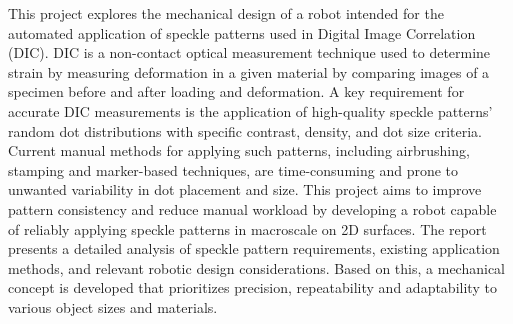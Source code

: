 This project explores the mechanical design of a robot intended for the automated application of speckle patterns used in Digital Image Correlation (DIC). DIC is a non-contact optical measurement technique used to determine strain by measuring deformation in a given material by comparing images of a specimen before and after loading and deformation. A key requirement for accurate DIC measurements is the application of high-quality speckle patterns' random dot distributions with specific contrast, density, and dot size criteria. Current manual methods for applying such patterns, including airbrushing, stamping and marker-based techniques, are time-consuming and prone to unwanted variability in dot placement and size. This project aims to improve pattern consistency and reduce manual workload by developing a robot capable of reliably applying speckle patterns in macroscale on 2D surfaces. The report presents a detailed analysis of speckle pattern requirements, existing application methods, and relevant robotic design considerations. Based on this, a mechanical concept is developed that prioritizes precision, repeatability and adaptability to various object sizes and materials. 

